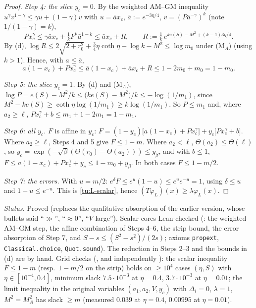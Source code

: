 \begin{proof}
\emph{Step 4: the slice $y_c=0$.} By the weighted AM--GM inequality $u^\gamma v^{1-\gamma}\le\gamma u+(1-\gamma)v$ with
$u=\bar ax_c$, $\bar a:=e^{-3\eta/4}$, $v=(P\bar a^{-\gamma})^{k}$ (note $1/(1-\gamma)=k$),
\[
Px_c^\gamma\le\gamma\bar ax_c+\tfrac1kP^k\bar a^{1-k}\le\bar ax_c+R,\qquad R:=\tfrac1k\,e^{ke(S)-M^2+(k-1)3\eta/4}.
\]
By (d), $\log R\le2\sqrt{2+r_0^2}+\tfrac34\eta\coth\eta-\log k-M^2\le\log m_0$ under (M$_A$) (using $k>1$). Hence, with $a\le\bar a$,
\[
a(1-x_c)+Px_c^\gamma\le\bar a(1-x_c)+\bar ax_c+R\le1-2m_0+m_0=1-m_0 .
\]

\emph{Step 5: the slice $y_c=1$.} By (d) and (M$_A$), $\log P=e(S)-M^2/k\le\big(ke(S)-M^2\big)/k\le-\log(1/m_1)$, since
$M^2-ke(S)\ge\coth\eta\log(1/m_1)\ge k\log(1/m_1)$. So $P\le m_1$ and, where $a_2\ge\ell$,
$Px_c^\gamma+b\le m_1+1-2m_1=1-m_1$.

\emph{Step 6: all $y_c$.} $F$ is affine in $y_c$: $F=(1-y_c)\big[a(1-x_c)+Px_c^\gamma\big]+y_c\big[Px_c^\gamma+b\big]$.
Where $a_2\ge\ell$, Steps 4 and 5 give $F\le1-m$. Where $a_2<\ell$, $\Theta(a_2)\le\Theta(\ell)$, so
$y_c=\exp(-\sqrt\beta(\Theta(r_0)-\Theta(a_2)))\le y_\beta$, and with $b\le1$,
$F\le a(1-x_c)+Px_c^\gamma+y_c\le1-m_0+y_\beta$. In both cases $F\le1-m/2$.

\emph{Step 7: the errors.} With $u=m/2$: $e^\delta F\le e^{u}(1-u)\le e^ue^{-u}=1$, using $\delta\le u$ and $1-u\le e^{-u}$.
This is \eqref{tu:L-scalar}, hence $(T\varphi_L)(x)\ge\lambda\varphi_L(x)$.
\end{proof}

\noindent\emph{Status.} Proved (replaces the qualitative absorption of the earlier version, whose bullets said ``$\gg$'',
``$\approx0$'', ``$V$ large''). Scalar cores Lean-checked (: the weighted AM--GM step, the affine
combination of Steps 4--6, the strip bound, the error absorption of Step 7, and $S-s\le(S^2-s^2)/(2s)$; axioms
\texttt{propext}, \texttt{Classical.choice}, \texttt{Quot.sound}). The reduction in Steps 2--3 and the bounds in (d) are
by hand. Grid checks (, and independently ): the scalar inequality $F\le1-m$
(resp.\ $1-m/2$ on the strip) holds on $\ge10^4$ cases $(\eta,S)$ with $\eta\in[10^{-4},0.4]$, minimum slack $7.5\cdot10^{-3}$ at
$\eta=0.4$, $3.7\cdot10^{-3}$ at $\eta=0.01$; the limit inequality in the original variables $(a_1,a_2,V,y_c)$ with
$\Delta_i=0$, $\lambda=1$, $M^2=M_A^2$ has slack $\ge m$ (measured $0.039$ at $\eta=0.4$, $0.00995$ at $\eta=0.01$).

